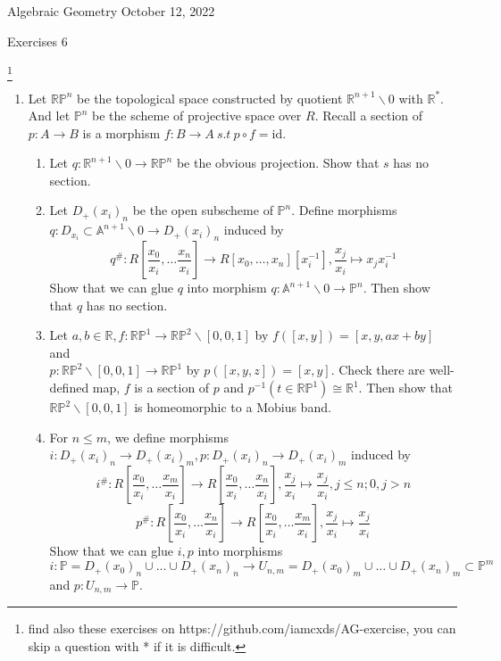 \documentclass[a4paper,11pt]{article}
\def\bb#1{\mathbb{#1}}
\def\mrm#1{\mathrm{#1}}
\begin{document}
{\small Algebraic Geometry \hfill October 12, 2022 \\}
\begin{center}
\Huge Exercises 6
\end{center}

\vskip0.6cm
\footnote{find also these exercises on https://github.com/iamcxds/AG-exercise, you can skip a question with * if it is difficult.}

\begin{enumerate}[1.]
\item Let $\bb{R}\bb{P}^n$ be the topological space constructed by quotient $\bb{R}^{n+1}\backslash 0$ with $\bb{R}^*$. And let $\bb{P}^n$ be the scheme of projective space over $R$. Recall a section of $p:A\to B$ is a morphism $f:B\to A \ s.t \ p\circ f =\mrm{id}$.
\begin{enumerate}
    \item Let $q:\bb{R}^{n+1}\backslash 0 \to \bb{R}\bb{P}^n$ be the obvious projection. Show that $s$ has no section.
    \item Let $D_+(x_i)_n$ be the open subscheme of $\bb{P}^n$. Define  morphisms $q: D_{x_i}\subset \bb{A}^{n+1}\backslash 0 \to D_+(x_i)_n$ induced by 
    \[ q^\#: R[\frac{x_0}{x_i},\ldots \frac{x_n}{x_i}]\to R[x_0,\ldots,x_n][x_i^{-1}],  \frac{x_j}{x_i} \mapsto x_jx_i^{-1}\]
    Show that we can glue $q$ into morphism $q: \bb{A}^{n+1}\backslash 0 \to \bb{P}^n$. Then show that $q$ has no section.
    \item Let $a,b \in \bb{R}, f:\bb{R}\bb{P}^1\to \bb{R}\bb{P}^2\backslash[0,0,1] $ by $f([x,y])=[x,y,ax+by]$ and
    \\ $p:\bb{R}\bb{P}^2\backslash[0,0,1]\to\bb{R}\bb{P}^1$ by $p([x,y,z])=[x,y]$. Check there are well-defined map, $f$ is a section of $p$ and $p^{-1}(t\in \bb{R}\bb{P}^1)\cong \bb{R}^1$. 
    Then show that $\bb{R}\bb{P}^2\backslash[0,0,1]$ is homeomorphic to a Mobius band.
    \item  For $n\leq m$, we define morphisms $i: D_+(x_i)_n\to D_+(x_i)_m, p:D_+(x_i)_n\to D_+(x_i)_m$ induced by 
    \[i^\#:R[\frac{x_0}{x_i},\ldots \frac{x_m}{x_i}]\to R[\frac{x_0}{x_i},\ldots \frac{x_n}{x_i}],  \frac{x_j}{x_i} \mapsto \frac{x_j}{x_i}, j\leq n; 0 , j>n \]
    \[p^\#: R[\frac{x_0}{x_i},\ldots \frac{x_n}{x_i}]\to R[\frac{x_0}{x_i},\ldots \frac{x_m}{x_i}],  \frac{x_j}{x_i} \mapsto \frac{x_j}{x_i}\] 
    Show that we can glue $i,p$ into morphisms 
    \[i:\bb{P}= D_+(x_0)_n\cup \ldots \cup D_+(x_n)_n \to U_{n,m}= D_+(x_0)_m\cup \ldots  \cup D_+(x_n)_m \subset \bb{P}^m \]
    and $p:U_{n,m}\to \bb{P}$.

\end{enumerate}
\end{enumerate}
\end{document}

